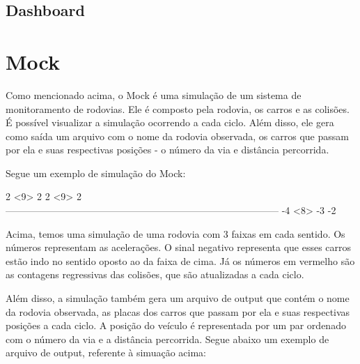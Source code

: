 \documentclass{article}
\def\openesc{\color{red}}
\def\closeesc{\color{black}}
\def\vbdelim{\catcode`<=\active\catcode`>=\active%
\def<{\openesc}
\def>{\closeesc}}
\begin{document}
    \subsection*{Dashboard}
    \lipsum[2]

    \section{Mock}
    Como mencionado acima, o Mock é uma simulação de um sistema de monitoramento de rodovias.
    Ele é composto pela rodovia, os carros e as colisões. É possível visualizar a simulação
    ocorrendo a cada ciclo. Além disso, ele gera como saída um arquivo com o nome da rodovia
    observada, os carros que passam por ela e suas respectivas posições - o número da via e 
    distância percorrida.
    
    Segue um exemplo de simulação do Mock:

    \begin{verbnobox}[\vbdelim]
2                                                     <9>                                                                                                           2                                                                                                                                        
 2                                                        <9>                 
                               2                                            
------------------------------------------------------------------------------------
                                                 -4                         
                                                 <8>                        -3         
             -2
    \end{verbnobox}
    
    Acima, temos uma simulação de uma rodovia com 3 faixas em cada sentido. Os números representam
    as acelerações. O sinal negativo representa que esses carros estão indo no sentido oposto ao
    da faixa de cima. Já os números em vermelho são as contagens regressivas das colisões, que são
    atualizadas a cada ciclo.

    Além disso, a simulação também gera um arquivo de output que contém o nome da rodovia observada,
    as placas dos carros que passam por ela e suas respectivas posições a cada ciclo. A posição do
    veículo é representada por um par ordenado com o número da via e a distância percorrida.
    Segue abaixo um exemplo de arquivo de output, referente à simuação acima:
\end{document}
